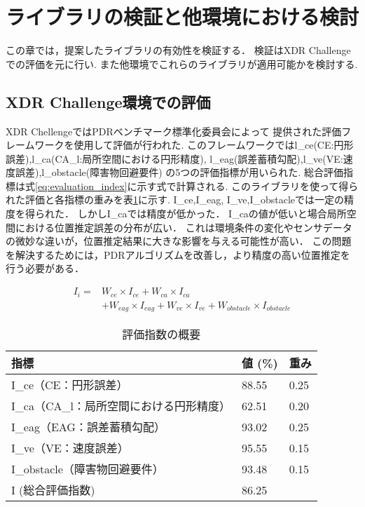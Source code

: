 
\section{ライブラリの検証と他環境における検討}
この章では，提案したライブラリの有効性を検証する．
検証はXDR Challengeでの評価を元に行い.
また他環境でこれらのライブラリが適用可能かを検討する.

\subsection{XDR Challenge環境での評価}
XDR ChellengeではPDRベンチマーク標準化委員会によって
提供された評価フレームワークを使用して評価が行われた.
このフレームワークではl\_ce(CE:円形誤差),l\_ca(CA\_l:局所空間における円形精度),
l\_eag(誤差蓄積勾配),l\_ve(VE:速度誤差),l\_obstacle(障害物回避要件)
の5つの評価指標が用いられた.
総合評価指標は式\ref{eq:evaluation_index}に示す式で計算される.
このライブラリを使って得られた評価と各指標の重みを表\ref{table:evaluation_index}に示す.
I\_ce,I\_eag, I\_ve,I\_obstacleでは一定の精度を得られた．
しかしI\_caでは精度が低かった．
I\_caの値が低いと場合局所空間における位置推定誤差の分布が広い．
これは環境条件の変化やセンサデータの微妙な違いが，位置推定結果に大きな影響を与える可能性が高い．
この問題を解決するためには，PDRアルゴリズムを改善し，より精度の高い位置推定を行う必要がある．

\begin{equation}
	\begin{aligned}
		I_i = & W_{ce} \times I_{ce} + W_{ca} \times I_{ca}                                        \\
		      & + W_{eag} \times I_{eag} + W_{ve} \times I_{ve} + W_{obstacle} \times I_{obstacle}
	\end{aligned}
	\label{eq:evaluation_index}
\end{equation}

\begin{table}[ht]
	\centering
	\begin{tabular}{l|l|l}
		\hline
		指標                        & 値 (\%) & 重み   \\ \hline
		I\_ce（CE：円形誤差）            & 88.55  & 0.25 \\
		I\_ca（CA\_l：局所空間における円形精度） & 62.51  & 0.20 \\
		I\_eag（EAG：誤差蓄積勾配）        & 93.02  & 0.25 \\
		I\_ve（VE：速度誤差）            & 95.55  & 0.15 \\
		I\_obstacle（障害物回避要件）      & 93.48  & 0.15 \\
		I (総合評価指数)                & 86.25  &      \\ \hline
	\end{tabular}
	\caption{評価指数の概要}
	\label{table:evaluation_index}
\end{table}




